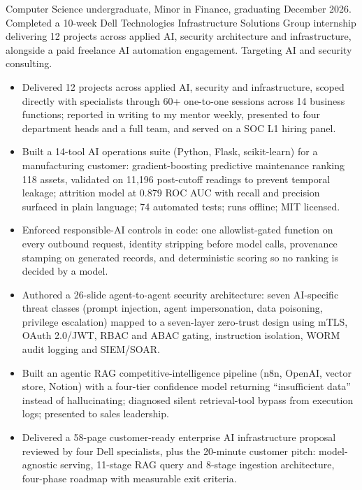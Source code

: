\documentclass{adelresume}
\begin{document}

Computer Science undergraduate, Minor in Finance, graduating December 2026. Completed a 10-week Dell Technologies Infrastructure Solutions Group internship delivering 12 projects across applied AI, security architecture and infrastructure, alongside a paid freelance AI automation engagement. Targeting AI and security consulting.

\begin{itemize}
  \item Delivered 12 projects across applied AI, security and infrastructure, scoped directly with specialists through 60+ one-to-one sessions across 14 business functions; reported in writing to my mentor weekly, presented to four department heads and a full team, and served on a SOC L1 hiring panel.
  \item Built a 14-tool AI operations suite (Python, Flask, scikit-learn) for a manufacturing customer: gradient-boosting predictive maintenance ranking 118 assets, validated on 11,196 post-cutoff readings to prevent temporal leakage; attrition model at 0.879 ROC AUC with recall and precision surfaced in plain language; 74 automated tests; runs offline; MIT licensed.
  \item Enforced responsible-AI controls in code: one allowlist-gated function on every outbound request, identity stripping before model calls, provenance stamping on generated records, and deterministic scoring so no ranking is decided by a model.
  \item Authored a 26-slide agent-to-agent security architecture: seven AI-specific threat classes (prompt injection, agent impersonation, data poisoning, privilege escalation) mapped to a seven-layer zero-trust design using mTLS, OAuth 2.0/JWT, RBAC and ABAC gating, instruction isolation, WORM audit logging and SIEM/SOAR.
  \item Built an agentic RAG competitive-intelligence pipeline (n8n, OpenAI, vector store, Notion) with a four-tier confidence model returning ``insufficient data'' instead of hallucinating; diagnosed silent retrieval-tool bypass from execution logs; presented to sales leadership.
  \item Delivered a 58-page customer-ready enterprise AI infrastructure proposal reviewed by four Dell specialists, plus the 20-minute customer pitch: model-agnostic serving, 11-stage RAG query and 8-stage ingestion architecture, four-phase roadmap with measurable exit criteria.

\end{itemize}
\end{document}
